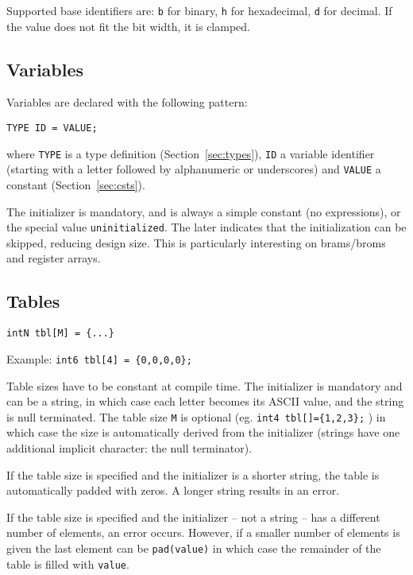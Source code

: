 \documentclass[a4]{article}
\begin{document}
Supported base identifiers are: \texttt{b} for binary, \texttt{h} for hexadecimal, \texttt{d} for decimal. If the value does not fit the bit width, it is clamped.


\subsection{Variables}

Variables are declared with the following pattern:

\texttt{TYPE ID = VALUE;}

\noindent where \texttt{TYPE} is a type definition (Section~\ref{sec:types}), \texttt{ID} a variable identifier (starting with a letter followed by alphanumeric or underscores) and \texttt{VALUE} a constant (Section~\ref{sec:csts}).

The initializer is mandatory, and is always a simple constant (no expressions), or the special
value \texttt{uninitialized}. The later indicates that the initialization can be skipped, reducing design size. This is particularly interesting on brams/broms and register arrays.

\subsection{Tables}

\texttt{intN tbl[M] = \{...\} }

\noindent Example:  \texttt{int6 tbl[4] = \{0,0,0,0\};}

\noindent Table sizes have to be constant at compile time. The initializer is mandatory and can be a string, in which case each letter becomes its ASCII value, and the string is null terminated. 
The table size \texttt{M} is optional (eg. \texttt{int4 tbl[]=\{1,2,3\};} ) in which case the size is automatically derived from the initializer (strings have one additional implicit character: the null terminator).

If the table size is specified and the initializer is a shorter string, the table is automatically padded with zeros. A longer string results in an error. 

If the table size is specified and the initializer -- not a string -- has a different number of elements, an error occurs. However, if a smaller number of elements is given the last element can be \texttt{pad(value)} in which case the remainder of the table is filled with \texttt{value}.
\end{document}
